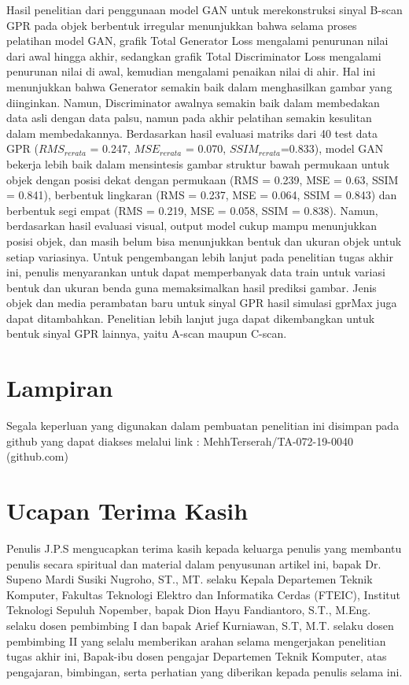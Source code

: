 \documentclass[conference]{IEEEtran}
\begin{document}
Hasil penelitian dari penggunaan model GAN untuk merekonstruksi sinyal B-scan GPR pada objek berbentuk irregular menunjukkan bahwa selama proses pelatihan model GAN, grafik Total Generator Loss mengalami penurunan nilai dari awal hingga akhir, sedangkan grafik Total Discriminator Loss mengalami penurunan nilai di awal, kemudian mengalami penaikan nilai di ahir. 
Hal ini menunjukkan bahwa Generator semakin baik dalam menghasilkan gambar yang diinginkan. Namun, Discriminator awalnya semakin baik dalam membedakan data asli dengan data palsu, namun pada akhir pelatihan semakin kesulitan dalam membedakannya.
Berdasarkan hasil evaluasi matriks dari 40 test data GPR ($RMS_{rerata}$ = 0.247, $MSE_{rerata}$ = 0.070, $SSIM_{rerata}$=0.833), model GAN bekerja lebih baik dalam mensintesis gambar struktur bawah permukaan untuk objek dengan posisi dekat dengan permukaan (RMS = 0.239, MSE = 0.63, SSIM = 0.841), berbentuk lingkaran (RMS = 0.237, MSE = 0.064, SSIM = 0.843) dan berbentuk segi empat (RMS = 0.219, MSE = 0.058, SSIM = 0.838).
Namun, berdasarkan hasil evaluasi visual, output model cukup mampu menunjukkan posisi objek, dan masih belum bisa menunjukkan bentuk dan ukuran objek untuk setiap variasinya.
Untuk pengembangan lebih lanjut pada penelitian tugas akhir ini, penulis menyarankan untuk dapat memperbanyak data train untuk variasi bentuk dan ukuran benda guna memaksimalkan hasil prediksi gambar.
Jenis objek dan media perambatan baru untuk sinyal GPR hasil simulasi gprMax juga dapat ditambahkan. Penelitian lebih lanjut juga dapat dikembangkan untuk bentuk sinyal GPR lainnya, yaitu A-scan maupun C-scan.

\section{Lampiran}

Segala keperluan yang digunakan dalam pembuatan penelitian ini disimpan pada github yang dapat diakses melalui link : MehhTerserah/TA-072-19-0040 (github.com)

\section{Ucapan Terima Kasih}

Penulis J.P.S mengucapkan terima kasih kepada keluarga penulis yang membantu penulis secara spiritual dan material dalam penyusunan artikel ini, 
bapak Dr. Supeno Mardi Susiki Nugroho, ST., MT. selaku Kepala Departemen Teknik Komputer, Fakultas Teknologi Elektro dan Informatika Cerdas (FTEIC), Institut Teknologi Sepuluh Nopember, 
bapak Dion Hayu Fandiantoro, S.T., M.Eng. selaku dosen pembimbing I dan bapak Arief Kurniawan, S.T, M.T. selaku dosen pembimbing II yang selalu memberikan arahan selama mengerjakan penelitian tugas akhir ini, 
Bapak-ibu dosen pengajar Departemen Teknik Komputer, atas pengajaran, bimbingan, serta perhatian yang diberikan kepada penulis selama ini.
\end{document}
